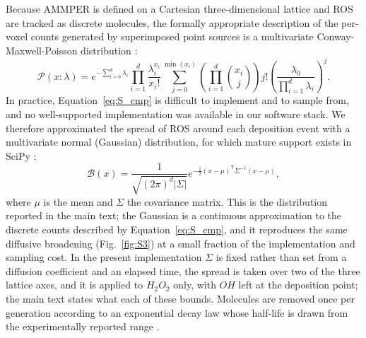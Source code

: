 \documentclass[11pt]{article}
\begin{document}
Because AMMPER is defined on a Cartesian three-dimensional lattice and ROS are
tracked as discrete molecules, the formally appropriate description of the
per-voxel counts generated by superimposed point sources is a multivariate
Conway-Maxwell-Poisson distribution
\citep{inouye2017review, trivedi2007copula, hajivassiliou1996simulation, luca2012multivariate, coles2001introduction}:
\begin{equation}
    \mathcal{P}(x:\lambda)
    = e^{-\sum_{i=0}^{d}\lambda_i}
      \prod_{i=1}^{d}\frac{\lambda_i^{x_i}}{x_i!}
      \sum_{j=0}^{\min(x_i)}
      \left(\prod_{i=1}^{d}\binom{x_i}{j}\right) j!
      \left(\frac{\lambda_0}{\prod_{i=1}^{d}\lambda_i}\right)^{j} .
    \label{eq:S_cmp}
\end{equation}
In practice, Equation~\ref{eq:S_cmp} is difficult to implement and to sample
from, and no well-supported implementation was available in our software stack.
We therefore approximated the spread of ROS around each deposition event with a
multivariate normal (Gaussian) distribution, for which mature support exists in
SciPy \citep{virtanen2020scipy}:
\begin{equation}
    \mathcal{B}(x)
    = \frac{1}{\sqrt{(2\pi)^{d}|\Sigma|}}
      e^{-\frac{1}{2}(x-\mu)^{\mathsf{T}}\Sigma^{-1}(x-\mu)} ,
    \label{eq:S_mvn}
\end{equation}
where $\mu$ is the mean and $\Sigma$ the covariance matrix. This is the
distribution reported in the main text; the Gaussian is a continuous
approximation to the discrete counts described by Equation~\ref{eq:S_cmp}, and
it reproduces the same diffusive broadening (Fig.~\ref{fig:S3}) at a small
fraction of the implementation and sampling cost. In the present implementation
$\Sigma$ is fixed rather than set from a diffusion coefficient and an elapsed
time, the spread is taken over two of the three lattice axes, and it is applied
to $H_2O_2$ only, with $OH$ left at the deposition point; the main text states
what each of these bounds. Molecules are removed once per generation according to
an exponential decay law whose half-life is drawn from the experimentally
reported range
\citep{petasne1997hydrogen, yazici2010factors, wagner2013assay, guarino2019reaction, nakamura2003micromolar, lushchak2016time, halliwell2000hydrogen, pryor2006free, chen2013decomposition}.

\end{document}
